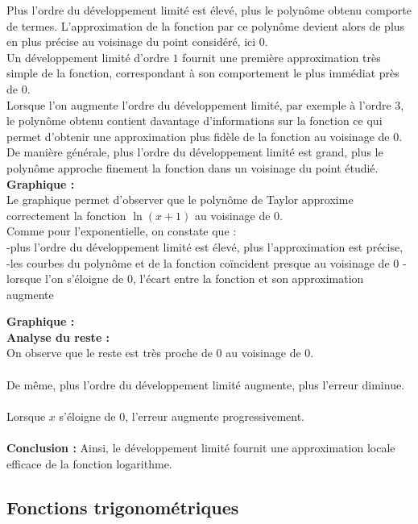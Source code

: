 \documentclass{article}
\begin{document}
Plus l’ordre du développement limité est élevé, plus le polynôme obtenu comporte de termes. L’approximation de la fonction par ce polynôme devient alors de plus en plus précise au voisinage du point considéré, ici $0$. \\
Un développement limité d’ordre $1$ fournit une première approximation très simple de la fonction, correspondant à son comportement le plus immédiat près de $0$. \\

Lorsque l’on augmente l’ordre du développement limité, par exemple à l’ordre $3$, le polynôme obtenu contient davantage d’informations sur la fonction ce qui permet d’obtenir une approximation plus fidèle de la fonction au voisinage de $0$. \\

De manière générale, plus l’ordre du développement limité est grand, plus le polynôme approche finement la fonction dans un voisinage du point étudié. \\

\textbf{Graphique : } \\
Le graphique permet d’observer que le polynôme de Taylor approxime correctement la fonction $\ln(x+1)$ au voisinage de $0$. \\
Comme pour l’exponentielle, on constate que : \\
-plus l’ordre du développement limité est élevé, plus l’approximation est précise, \\
-les courbes du polynôme et de la fonction coïncident presque au voisinage de 0
-lorsque l’on s’éloigne de 0, l’écart entre la fonction et son approximation augmente

\textbf{Graphique : } \\


\textbf{Analyse du reste :} \\
On observe que le reste est très proche de 0 au voisinage de 0. \\ \\
De même, plus l’ordre du développement limité augmente, plus l’erreur diminue.\\ \\
Lorsque $x$ s’éloigne de 0, l’erreur augmente progressivement. \\ \\
\textbf{Conclusion :} Ainsi, le développement limité fournit une approximation locale efficace de la fonction logarithme.


\subsection{Fonctions trigonométriques}
\end{document}
